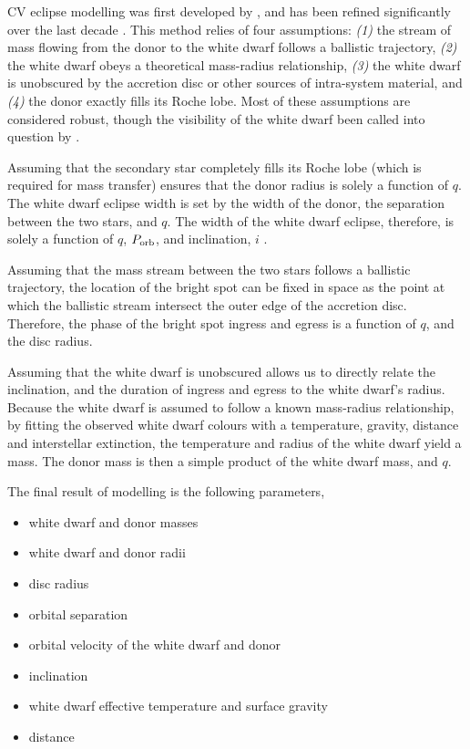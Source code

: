 CV eclipse modelling was first developed by \citet{wood1986}, and has been refined significantly over the last decade \citep{Savoury2011, McAllister2017, McAllister2019}. This method relies of four assumptions: \textit{(1)} the stream of mass flowing from the donor to the white dwarf follows a ballistic trajectory, \textit{(2)} the white dwarf obeys a theoretical mass-radius relationship, \textit{(3)} the white dwarf is unobscured by the accretion disc or other sources of intra-system material, and \textit{(4)} the donor exactly fills its Roche lobe. Most of these assumptions are considered robust, though the visibility of the white dwarf been called into question by \citet{Spark2015}.

Assuming that the secondary star completely fills its Roche lobe (which is required for mass transfer) ensures that the donor radius is solely a function of $q$. The white dwarf eclipse width is set by the width of the donor, the separation between the two stars, and $q$. The width of the white dwarf eclipse, therefore, is solely a function of $q$, $P_{\rm orb}$, and inclination, $i$ \citep{bailey1979}. 

Assuming that the mass stream between the two stars follows a ballistic trajectory, the location of the bright spot can be fixed in space as the point at which the ballistic stream intersect the outer edge of the accretion disc. Therefore, the phase of the bright spot ingress and egress is a function of $q$, and the disc radius. 

Assuming that the white dwarf is unobscured allows us to directly relate the inclination, and the duration of ingress and egress to the white dwarf's radius. Because the white dwarf is assumed to follow a known mass-radius relationship, by fitting the observed white dwarf colours with a temperature, gravity, distance and interstellar extinction, the temperature and radius of the white dwarf yield a mass. The donor mass is then a simple product of the white dwarf mass, and $q$.

The final result of modelling is the following parameters,
\begin{itemize}
    \item white dwarf and donor masses
    \item white dwarf and donor radii
    \item disc radius
    \item orbital separation
    \item orbital velocity of the white dwarf and donor
    \item inclination
    \item white dwarf effective temperature and surface gravity
    \item distance
\end{itemize}

